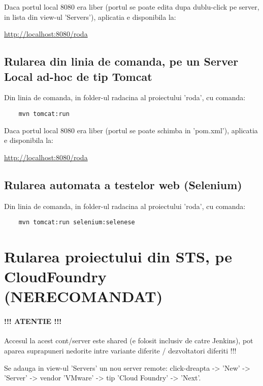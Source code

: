 Daca portul local 8080 era liber (portul se poate edita dupa dublu-click pe
server, in lista din view-ul 'Servers'), aplicatia e disponibila la:

\url{http://localhost:8080/roda}

\subsection{Rularea din linia de comanda, pe un Server Local ad-hoc de tip
Tomcat}
Din linia de comanda, in folder-ul radacina al proiectului 'roda', cu comanda:
\begin{lstlisting}
	mvn tomcat:run
\end{lstlisting}
Daca portul local 8080 era liber (portul se poate schimba in 'pom.xml'),
aplicatia e disponibila la:

\url{http://localhost:8080/roda}

\subsection{Rularea automata a testelor web (Selenium)}
Din linia de comanda, in folder-ul radacina al proiectului 'roda', cu comanda:
\begin{lstlisting}
	mvn tomcat:run selenium:selenese
\end{lstlisting}

\section{Rularea proiectului din STS, pe CloudFoundry (NERECOMANDAT)}

\paragraph{!!! ATENTIE !!!} 
Accesul la acest cont/server este shared (e folosit
inclusiv de catre Jenkins), 
pot aparea suprapuneri nedorite intre variante diferite / dezvoltatori diferiti !!!

Se adauga in view-ul 'Servers' un nou server remote: click-dreapta -> 'New'
-> 'Server' -> vendor 'VMware' -> tip 'Cloud Foundry' -> 'Next'.

